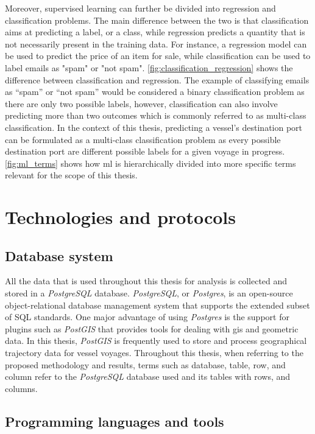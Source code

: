 Moreover, supervised learning can further be divided into regression and classification problems. The main difference between the two is that classification aims at predicting a label, or a class, while regression predicts a quantity that is not necessarily present in the training data. For instance, a regression model can be used to predict the price of an item for sale, while classification can be used to label emails as "spam" or "not spam". \cref{fig:classification_regression} shows the difference between classification and regression. The example of classifying emails as ``spam'' or ``not spam'' would be considered a binary classification problem as there are only two possible labels, however, classification can also involve predicting more than two outcomes which is commonly referred to as multi-class classification. In the context of this thesis, predicting a vessel's destination port can be formulated as a multi-class classification problem as every possible destination port are different possible labels for a given voyage in progress. \cref{fig:ml_terms} shows how \acrshort{ml} is hierarchically divided into more specific terms relevant for the scope of this thesis.


\section{Technologies and protocols}

\subsection{Database system}

All the data that is used throughout this thesis for analysis is collected and stored in a \textit{PostgreSQL} database. \textit{PostgreSQL}, or \textit{Postgres}, is an open-source object-relational database management system that supports the extended subset of SQL standards. One major advantage of using \textit{Postgres} is the support for plugins such as \textit{PostGIS} that provides tools for dealing with \acrshort{gis} and geometric data. In this thesis, \textit{PostGIS} is frequently used to store and process geographical trajectory data for vessel voyages. Throughout this thesis, when referring to the proposed methodology and results, terms such as database, table, row, and column refer to the \textit{PostgreSQL} database used and its tables with rows, and columns.

\subsection{Programming languages and tools}

